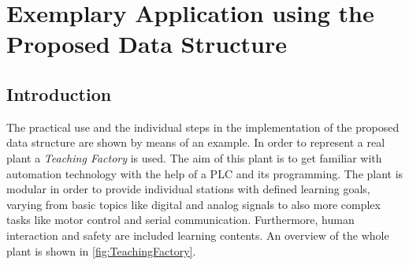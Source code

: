
\chapter{Exemplary Application using the Proposed Data Structure}   \label{sec:Example}
\section{Introduction}
    The practical use and the individual steps in the implementation of the proposed data structure are shown by means of an example. In order to represent a real plant a \textit{Teaching Factory} is used. The aim of this plant is to get familiar with automation technology with the help of a PLC and its programming. The plant is modular in order to provide individual stations with defined learning goals, varying from basic topics like digital and analog signals to also more complex tasks like motor control and serial communication. Furthermore, human interaction and safety are included learning contents. An overview of the whole plant is shown in \autoref{fig:TeachingFactory}.

